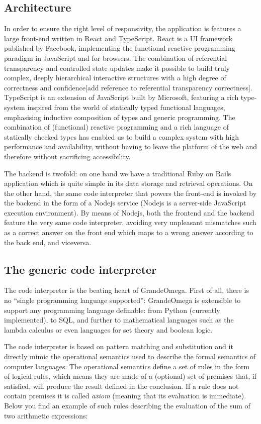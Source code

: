 \subsection{Architecture}
In order to ensure the right level of responsivity, the application is features a large front-end written in React and TypeScript. React is a UI framework published by Facebook, implementing the functional reactive programming paradigm \cite{react,Hudak1999} in JavaScript and for browsers. The combination of referential transparency and controlled state updates make it possible to build truly complex, deeply hierarchical interactive structures with a high degree of correctness and confidence[add reference to referential transparency correctness]. TypeScript is an extension of JavaScript built by Microsoft, featuring a rich type-system inspired from the world of statically typed functional languages, emphasising inductive composition of types and generic programming. The combination of (functional) reactive programming and a rich language of statically checked types has enabled us to build a complex system with high performance and availability, without having to leave the platform of the web and therefore without sacrificing accessibility.


The backend is twofold: on one hand we have a traditional Ruby on Rails application which is quite simple in its data storage and retrieval operations. On the other hand, the same code interpreter that powers the front-end is invoked by the backend in the form of a Nodejs service (Nodejs is a server-side JavaScript execution environment). By means of Nodejs, both the frontend and the backend feature the very same code interpreter, avoiding very unpleasant mismatches such as a correct answer on the front end which maps to a wrong answer according to the back end, and viceversa.

\subsection{The generic code interpreter}
The code interpreter is the beating heart of GrandeOmega. First of all, there is no “single programming language supported”: GrandeOmega is extensible to support any programming language definable: from Python (currently implemented), to SQL, and further to mathematical languages such as the lambda calculus or even languages for set theory and boolean logic.

The code interpreter is based on pattern matching and substitution and it directly mimic the operational semantics \cite{plotkin1981structural} used to describe the formal semantics of computer languages. The operational semantics define a set of rules in the form of logical rules, which means they are made of a (optional) set of premises that, if satisfied, will produce the result defined in the conclusion. If a rule does not contain premises it is called \textit{axiom} (meaning that its evaluation is immediate). Below you find an example of such rules describing the evaluation of the sum of two arithmetic expressions:

